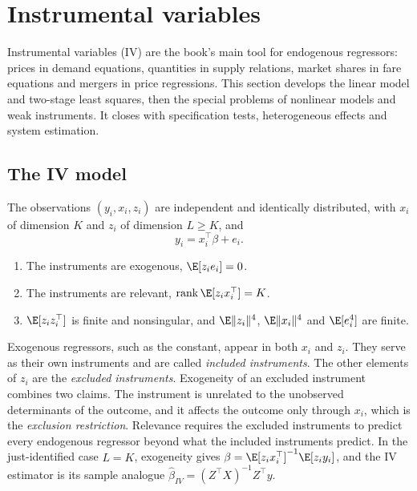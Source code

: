 \section{Instrumental variables}\label{sec:A-iv}

Instrumental variables (IV) are the book's main tool for endogenous regressors: prices in demand equations,
quantities in supply relations, market shares in fare equations and mergers in price regressions. This
section develops the linear model and two-stage least squares, then the special problems of nonlinear models
and weak instruments. It closes with specification tests, heterogeneous effects and system estimation.

\subsection{The IV model}\label{sec:A-ivmodel}

\begin{assumption}\label{ass:A-iv}
The observations $(y_i, x_i, z_i)$ are independent and identically distributed, with $x_i$ of dimension $K$
and $z_i$ of dimension $L \ge K$, and
\begin{equation}\label{eq:A-iv-model}
y_i = x_i^\top\beta + e_i .
\end{equation}
\begin{enumerate}[label=(\roman*)]
\item The instruments are exogenous, $\E[z_ie_i] = 0$.
\item The instruments are relevant, $\mathrm{rank}\,\E[z_ix_i^\top] = K$.
\item $\E[z_iz_i^\top]$ is finite and nonsingular, and $\E\lVert z_i\rVert^4$, $\E\lVert x_i\rVert^4$ and $\E[e_i^4]$
  are finite.
\end{enumerate}
\end{assumption}

Exogenous regressors, such as the constant, appear in both $x_i$ and $z_i$. They serve as their own
instruments and are called \emph{included instruments}. The other elements of $z_i$ are the \emph{excluded
instruments}. Exogeneity of an excluded instrument combines two claims. The instrument is unrelated to the
unobserved determinants of the outcome, and it affects the outcome only through $x_i$, which is the
\emph{exclusion restriction}. Relevance requires the excluded instruments to predict every endogenous
regressor beyond what the included instruments predict. In the just-identified case $L = K$, exogeneity gives
$\beta = \E[z_ix_i^\top]^{-1}\E[z_iy_i]$, and the IV estimator is its sample analogue
$\hat\beta_{IV} = (Z^\top X)^{-1}Z^\top y$.

